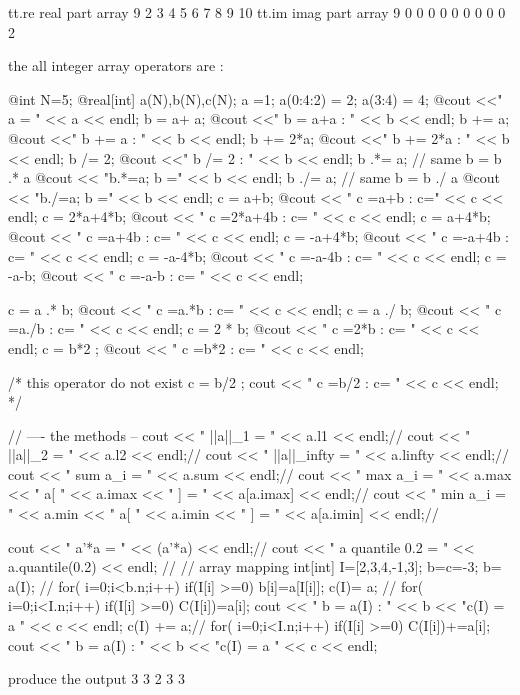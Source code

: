 \documentclass[a4paper,twoside,12pt]{book}
\def\n{\nabla}
\begin{document}
 tt.re real part array   9	
	  2	  3	  4	  5	  6
	  7	  8	  9	 10	
 tt.im imag part array   9	
	  0	  0	  0	  0	  0
	  0	  0	  0	  0	
2	
\eFF

the all integer array operators are  : %

\bFF

{
@int N=5;
@real[int] a(N),b(N),c(N);
a =1;
a(0:4:2) = 2;
a(3:4) = 4;
@cout <<" a = " << a << endl;
b = a+ a;
@cout <<" b = a+a : " << b << endl;
b += a;
@cout <<" b += a : " << b << endl;
b += 2*a;
@cout <<" b += 2*a : " << b << endl;
b /= 2;
@cout <<" b /= 2 : " << b << endl;
b .*= a; // same b = b .* a
@cout << "b.*=a; b =" << b << endl;
b ./= a; // same b = b ./ a
@cout << "b./=a; b =" << b << endl;
c = a+b;
@cout << " c =a+b : c=" << c << endl;
c = 2*a+4*b;
@cout << " c =2*a+4b : c= " << c << endl;
c = a+4*b;
@cout << " c =a+4b : c= " << c << endl;
c = -a+4*b;
@cout << " c =-a+4b : c= " << c << endl;
c = -a-4*b;
@cout << " c =-a-4b : c= " << c << endl;
c = -a-b;
@cout << " c =-a-b : c= " << c << endl;

c = a .* b;
@cout << " c =a.*b  : c= " << c << endl;
c = a ./ b;
@cout << " c =a./b  : c= " << c << endl;
c = 2 * b;
@cout << " c =2*b   : c= " << c << endl;
c =  b*2 ;
@cout << " c =b*2   : c= " << c << endl;

/*  this operator do not exist
c =  b/2 ;
cout << " c =b/2   : c= " << c << endl;
*/

// ---- the  methods --
cout << " ||a||_1     = " <<  a.l1     << endl;//
cout << " ||a||_2     = " <<  a.l2     << endl;//
cout << " ||a||_infty = " <<  a.linfty << endl;//
cout << " sum a_i     = " <<  a.sum    << endl;//
cout << " max a_i     = " <<  a.max  << " a[  " << a.imax << " ] = " << a[a.imax]     << endl;//
cout << " min a_i     = " <<  a.min  << " a[  " << a.imin << " ] = " << a[a.imin]    << endl;//

cout << " a'*a        = " <<  (a'*a)   << endl;//
cout << " a quantile 0.2 = " <<  a.quantile(0.2) << endl; //
// array mapping 
int[int] I=[2,3,4,-1,3];
b=c=-3; 
b= a(I); // for( i=0;i<b.n;i++) if(I[i] >=0)  b[i]=a[I[i]];
c(I)= a; // for( i=0;i<I.n;i++) if(I[i] >=0)  C(I[i])=a[i];
cout << " b = a(I) : " << b << "\n  c(I) = a " << c << endl;
c(I) += a;// for( i=0;i<I.n;i++) if(I[i] >=0)  C(I[i])+=a[i];
cout << " b = a(I) : " << b << "\n  c(I) = a " << c << endl;   

}
\eFF
produce the output
          3       3       2       3       3
\end{document}
